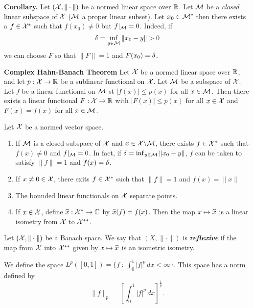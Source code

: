 \vs

\textbf{Corollary.} Let $(\mathcal{X},\|\cdot\|)$ be a normed linear space over $\mathbb{R}$. Let $\mathcal{M}$ be a \textit{closed} linear subspace of $\mathcal{X}$ ($\mathcal{M}$ a proper linear subset). Let $x_0\in \mathcal{M}^c$ then there exists a $f\in \mathcal{X}^*$ such that $f(x_0) \neq 0$ but $f|_{\mathcal{M}} = 0$. Indeed, if 
\[\delta = \inf_{y \in \mathcal{M}} \|x_0 - y\| > 0\]
we can choose $F$ so that $\|F\| = 1$ and $F(x_0) = \delta$.

\vs

\textbf{Complex Hahn-Banach Theorem} Let $\mathcal{X}$ be a normed linear space over $\mathbb{R}$, and let $p:\mathcal{X}\rightarrow \mathbb{R}$ be a sublinear functional on $\mathcal{X}$. Let $\mathcal{M}$ be a subspace of $\mathcal{X}$. Let $f$ be a linear functional on $\mathcal{M}$ st $|f(x)| \leq p(x)$ for all $x\in \mathcal{M}$. Then there exists a linear functional $F:\mathcal{X}\rightarrow \mathbb{R}$ with $|F(x)|\leq p(x)$ for all $x\in \mathcal{X}$ and $F(x) = f(x)$ for all $x\in \mathcal{M}$.

\vs
\setcounter{thm}{7}

\begin{thm}Let $\mathcal{X}$ be a normed vector space.
\begin{enumerate}[\hspace{1em}a.]
    \item If $\mathcal{M}$ is a closed subspace of $\mathcal{X}$ and $x\in \mathcal{X}\backslash\mathcal{M}$, there exists $f\in \mathcal{X}^*$ such that $f(x)\neq 0$ and $f|_{\mathcal{M}} = 0$. In fact, if $\delta = \inf_{y \in \mathcal{M}} \|x_0 - y\|$, $f$ can be taken to satisfy $\|f\| = 1$ and $f(x) = \delta$.
    \item If $x\neq 0\in \mathcal{X}$, there exits $f\in \mathcal{X}^*$ such that $\|f\| = 1$ and $f(x) = \|x\|$
    \item The bounded linear functionals on $\mathcal{X}$ separate points.
    \item If $x\in \mathcal{X}$, define $\widehat x:\mathcal{X}^*\rightarrow \mathbb{C}$ by $\widehat x(f) = f(x)$. Then the map $x\mapsto \widehat x$ is a linear isometry from $\mathcal{X}$ to $\mathcal{X}^{**}$.
\end{enumerate}
\end{thm}

\vs

\dfn Let $(\mathcal{X}, \|\cdot\|)$ be a Banach space. We say that $(X, \|\cdot\|)$ is \textbf{\textit{reflexive}} if the map from $\mathcal{X}$ into $\mathcal{X}^{**}$ given by $x\mapsto\widehat x$ is an isometric isometry.

\vs

\dfn We define the space $L^p([0,1]) = \{ f\ : \ \int_0^1 |f|^p\,dx< \infty\}$. This space has a norm defined by 
\[\|f\|_p = \left[\int_0^1 |f|^p\,dx\right]^\frac{1}{p}.\]

